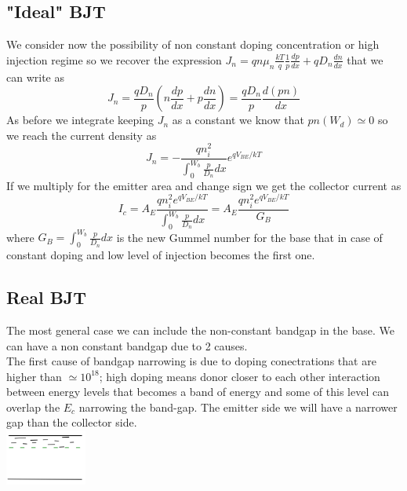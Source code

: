 \subsection{"Ideal" BJT}
We consider now the possibility of non constant doping concentration or high injection regime so we recover the expression $J_n=qn\mu_n \frac{kT}{q}\frac{1}{p}\frac{dp}{dx}+qD_n \frac{dn}{dx}$ that we can write as
\begin{equation}
J_n=\frac{qD_n}{p}\left(n \frac{dp}{dx}+p \frac{dn}{dx}\right)= \frac{qD_n}{p}\frac{d(pn)}{dx}
\end{equation}
As before we integrate keeping $J_n$ as a constant we know that $pn(W_d)\simeq 0$ so we reach the current density as 
\begin{equation}
J_n=-\frac{qn_i^2}{\int^{W_b}_0 \frac{p}{D_n}dx}e^{qV_{BE}/kT}
\end{equation}
If we multiply for the emitter area and change sign we get the collector current as 
\begin{equation}
I_c=A_E\frac{qn_i^2 e^{qV_{BE}/kT}}{\int^{W_b}_0 \frac{p}{D_n}dx}=A_E\frac{qn_i^2 e^{qV_{BE}/kT}}{G_B}
\end{equation}
where $G_B=\int^{W_b}_0 \frac{p}{D_n}dx$ is the new Gummel number for the base that in case of constant doping and low level of injection becomes the first one.\\

\subsection{Real BJT}
The most general case we can include the non-constant bandgap in the base. We can have a non constant bandgap due to 2 causes.\\
The first cause of bandgap narrowing is due to doping conectrations that are higher than $\simeq 10^{18}$; high doping means donor closer to each other interaction between energy levels that becomes a band of energy and some of this level can overlap the $E_c$ narrowing the band-gap. The emitter side we will have a narrower gap than the collector side.\\

\centering
\includegraphics[width=0.2\textwidth]{bjt5.png}\\
\raggedright

